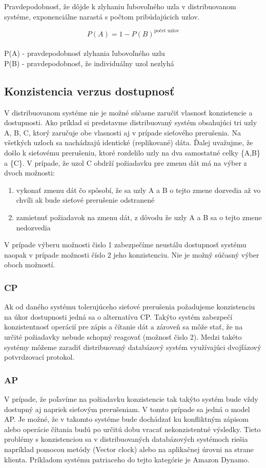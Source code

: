 \documentclass[11pt,twoside,a4paper]{book}
\begin{document}
\noindent
Pravdepodobnosť, že dôjde k zlyhaniu ľubovoľného uzla v distribuovanom systéme, exponenciálne narastá s počtom pribúdajúcich uzlov.

$$P(A) = 1 - P(B)^{\textrm{počet uzlov}}$$
\\
P(A) - pravdepodobnosť zlyhania ľubovoľného uzlu \\
P(B) - pravdepodobnosť, že individuálny uzol nezlyhá

\subsection{Konzistencia verzus dostupnosť}

V distribuovanom systéme nie je možné súčasne zaručiť vlasnosť konzistencie a dostupnosti. Ako príklad si predstavme distribuovaný systém obsahujúci tri uzly A, B, C, ktorý zaručuje obe vlasnosti aj v prípade sieťového prerušenia. Na všetkých uzloch sa nachádzajú identické (replikované) dáta. Ďalej uvažujme, že došlo k sieťovému prerušeniu, ktoré rozdelilo uzly na dva samostatné celky \{A,B\} a \{C\}. V prípade, že uzol C obdrží požiadavku pre zmenu dát má na výber z dvoch možnosti:
\begin{enumerate}
 \item vykonať zmenu dát čo spôsobí, že sa uzly A a B o tejto zmene dozvedia až vo chvíli ak bude sieťové prerušenie odstranené
 \item zamietnuť požiadavok na zmenu dát, z dôvodu že uzly A a B sa o tejto zmene nedozvedia
\end{enumerate}

V prípade výberu možnosti čislo 1 zabezpečíme neustálu dostupnosť systému naopak v prípade možnosti číslo 2 jeho konzistenciu. Nie je možný súčasný výber oboch možností.

\subsubsection*{CP}
Ak od daného systému tolerujúceho sieťové prerušenia požadujeme konzistenciu na úkor dostupnosti jedná sa o alternatívu CP. Takýto systém zabezpečí konzistentnosť operácií pre zápis a čítanie dát a zároveň sa môže stať, že na určité požiadavky nebude schopný reagovať (možnosť čislo 2). Medzi takéto systémy môžeme zaradiť distribuovaný databázový systém využívajúci dvojfázový potvrdzovací protokol.

\subsubsection*{AP}
V prípade, že poľavíme na požiadavku konzistencie tak takýto systém bude vždy dostupný aj napriek sieťovým prerušeniam. V tomto prípade sa jedná o model AP. Je možné, že v takomto systéme bude dochádzať ku konfliktným zápisom alebo operácie čítania budú po určitú dobu vracať nekonzistentné výsledky. Tieto problémy s konzistenciou sa v distribuovaných databázových systémoch riešia napríklad pomocou metódy  (Vector clock) \cite{TODO} alebo na aplikačnej úrovni na strane klienta. Príkladom systému patriaceho do tejto kategórie je Amazon Dynamo.
\end{document}
